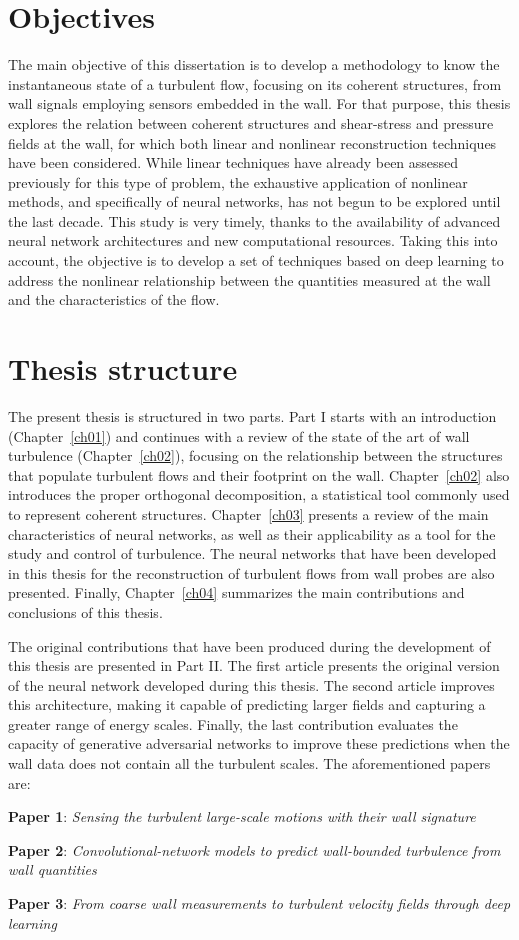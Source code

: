 \section{Objectives}
The main objective of this dissertation is to develop a methodology to know the instantaneous state of a turbulent flow, focusing on its coherent structures, from wall signals employing sensors embedded in the wall.
For that purpose, this thesis explores the relation between coherent structures and shear-stress and pressure fields at the wall, for which both linear and nonlinear reconstruction techniques have been considered.
While linear techniques have already been assessed previously for this type of problem, the exhaustive application of nonlinear methods, and specifically of neural networks, has not begun to be explored until the last decade.
This study is very timely, thanks to the availability of advanced neural network architectures and new computational resources.
Taking this into account, the objective is to develop a set of techniques based on deep learning to address the nonlinear relationship between the quantities measured at the wall and the characteristics of the flow.

\section{Thesis structure}
The present thesis is structured in two parts.
Part I starts with an introduction (Chapter~\ref{ch01}) and continues with a review of the state of the art of wall turbulence (Chapter~\ref{ch02}), focusing on the relationship between the structures that populate turbulent flows and their footprint on the wall.
Chapter~\ref{ch02} also introduces the proper orthogonal decomposition, a statistical tool commonly used to represent coherent structures.
Chapter~\ref{ch03} presents a review of the main characteristics of neural networks, as well as their applicability as a tool for the study and control of turbulence.
The neural networks that have been developed in this thesis for the reconstruction of turbulent flows from wall probes are also presented.
Finally, Chapter~\ref{ch04} summarizes the main contributions and conclusions of this thesis.

The original contributions that have been produced during the development of this thesis are presented in Part II.
The first article presents the original version of the neural network developed during this thesis.
The second article improves this architecture, making it capable of predicting larger fields and capturing a greater range of energy scales.
Finally, the last contribution evaluates the capacity of generative adversarial networks to improve these predictions when the wall data does not contain all the turbulent scales.
The aforementioned papers are:

\noindent\textbf{Paper 1}: \textit{Sensing the turbulent large-scale motions with their wall signature}

\noindent\textbf{Paper 2}: \textit{Convolutional-network models to predict wall-bounded turbulence from wall quantities}

\noindent\textbf{Paper 3}: \textit{From coarse wall measurements to turbulent velocity fields through deep learning}
